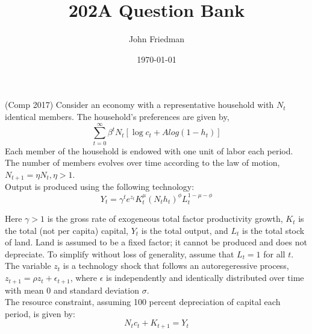 \documentclass[answers]{exam}
\title{202A Question Bank}
\author{John Friedman}
\date{\today}
\begin{document}
\maketitle

\begin{questions}

\question (Comp 2017) Consider an economy with a representative household with $N_t$ identical members. The household's preferences are given by,
$$\sum_{t=0}^{\infty} \beta^t N_t [\log{c_t} + A log(1-h_t)]$$
Each member of the household is endowed with one unit of labor each period. The number of members evolves over time according to the law of motion, $N_{t+1} = \eta N_t, \eta>1$. \\
Output is produced using the following technology:
$$Y_t = \gamma^t e^{z_t} K_t^\mu (N_t h_t)^{\phi} L_t^{1-\mu - \phi}$$

Here $\gamma > 1$ is the gross rate of exogeneous total factor productivity growth, $K_t$ is the total (not per capita) capital, $Y_t$ is the total output, and $L_t$ is the total stock of land. Land is assumed to be a fixed factor; it cannot be produced and does not depreciate. To simplify without loss of generality, assume that $L_t = 1$ for all $t$. \\
The variable $z_t$ is a technology shock that follows an autoregeressive process, $z_{t+1} =\rho z_t + \epsilon_{t+1}$, where $\epsilon$ is independently and identically distributed over time with mean 0 and standard deviation $\sigma$.\\
The resource constraint, assuming 100 percent depreciation of capital each period, is given by:
$$N_t c_t + K_{t+1} = Y_t$$
\begin{parts}

\end{parts}
\end{questions}
\end{document}
